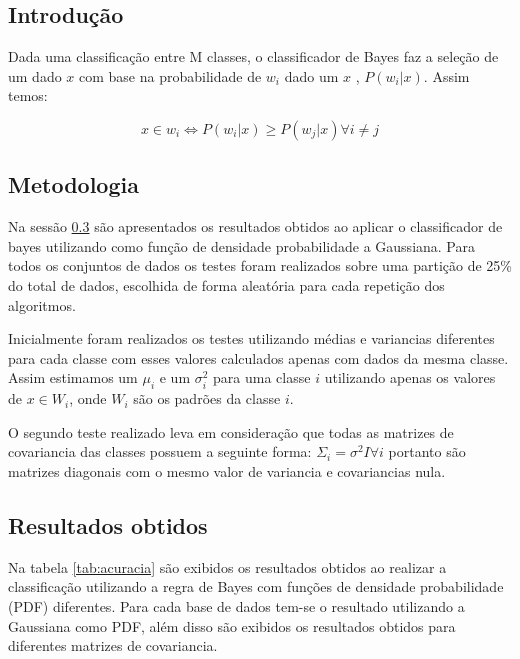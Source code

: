 \documentclass[ 
	article,			%
	11pt,				%
	oneside,			%
	a4paper,			%
	english,			%
	brazil,				%
	]{abntex2}
\begin{document}
\subsection{Introdução}
Dada uma classificação entre M classes, o classificador de Bayes faz a seleção
de um dado $x$ com base na probabilidade de $w_i$ dado um $x$ , $P(w_i|x)$.
Assim temos:


\begin{equation}
	x \in w_i \iff P(w_i|x) \geq P(w_j|x) \forall i \neq j
\end{equation}

\subsection{Metodologia}
\label{ss:metAplbayes}
Na sessão \ref{ss:resultadosObtidos} são apresentados os resultados obtidos ao
aplicar o classificador de bayes utilizando como função de densidade
probabilidade a Gaussiana. Para todos os conjuntos de dados os testes foram
realizados sobre uma partição de 25\% do total de dados, escolhida de forma
aleatória para cada repetição dos algoritmos.

Inicialmente foram realizados os testes utilizando médias e variancias
diferentes para cada classe com esses valores calculados apenas com dados
da mesma classe. Assim estimamos um $\mu_i$ e um $\sigma^2_i$ para uma classe
$i$ utilizando apenas os valores de $x \in W_i$, onde $W_i$ são os padrões da
classe $i$.

O segundo teste realizado leva em consideração que todas as matrizes de
covariancia das classes possuem a seguinte forma: $\Sigma_i=\sigma^2I \forall i$
portanto são matrizes diagonais com o mesmo valor de variancia e covariancias
nula.

 
\subsection{Resultados obtidos}
\label{ss:resultadosObtidos}

Na tabela \ref{tab:acuracia} são exibidos os resultados obtidos ao realizar a
classificação utilizando a regra de Bayes com funções de densidade probabilidade
(PDF) diferentes. Para cada base de dados tem-se o resultado utilizando a
Gaussiana como PDF, além disso são exibidos os resultados obtidos para
diferentes matrizes de covariancia.
\end{document}
